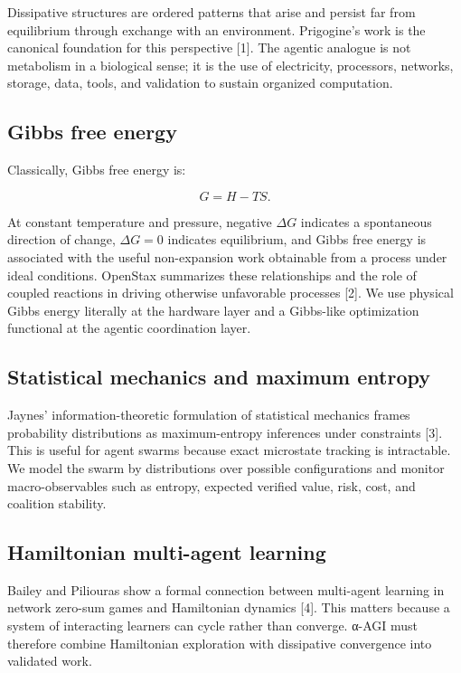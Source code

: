 \documentclass[
  11pt,
]{article}
\begin{document}
Dissipative structures are ordered patterns that arise and persist far
from equilibrium through exchange with an environment. Prigogine's work
is the canonical foundation for this perspective {[}1{]}. The agentic
analogue is not metabolism in a biological sense; it is the use of
electricity, processors, networks, storage, data, tools, and validation
to sustain organized computation.

\subsection{Gibbs free energy}\label{gibbs-free-energy}

Classically, Gibbs free energy is:

\[
G=H-TS.
\]

At constant temperature and pressure, negative \(\Delta G\) indicates a
spontaneous direction of change, \(\Delta G=0\) indicates equilibrium,
and Gibbs free energy is associated with the useful non-expansion work
obtainable from a process under ideal conditions. OpenStax summarizes
these relationships and the role of coupled reactions in driving
otherwise unfavorable processes {[}2{]}. We use physical Gibbs energy
literally at the hardware layer and a Gibbs-like optimization functional
at the agentic coordination layer.

\subsection{Statistical mechanics and maximum
entropy}\label{statistical-mechanics-and-maximum-entropy}

Jaynes' information-theoretic formulation of statistical mechanics
frames probability distributions as maximum-entropy inferences under
constraints {[}3{]}. This is useful for agent swarms because exact
microstate tracking is intractable. We model the swarm by distributions
over possible configurations and monitor macro-observables such as
entropy, expected verified value, risk, cost, and coalition stability.

\subsection{Hamiltonian multi-agent
learning}\label{hamiltonian-multi-agent-learning}

Bailey and Piliouras show a formal connection between multi-agent
learning in network zero-sum games and Hamiltonian dynamics {[}4{]}.
This matters because a system of interacting learners can cycle rather
than converge. α-AGI must therefore combine Hamiltonian exploration with
dissipative convergence into validated work.
\end{document}
